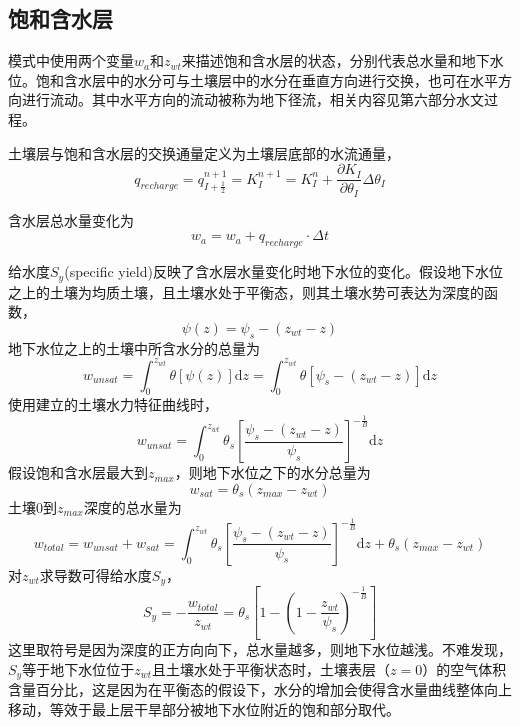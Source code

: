 \subsection{饱和含水层}
模式中使用两个变量$w_a$和$z_{wt}$来描述饱和含水层的状态，分别代表总水量和地下水位。饱和含水层中的水分可与土壤层中的水分在垂直方向进行交换，也可在水平方向进行流动。其中水平方向的流动被称为地下径流，相关内容见第六部分水文过程。

土壤层与饱和含水层的交换通量定义为土壤层底部的水流通量，
\begin{equation}
{q}_{recharge}=q_{I+\frac{1}{2}}^{n+1}=K_{I}^{n+1} = K_I^n + \frac{\partial K_{I}}{\partial \theta_{I}} \Delta \theta_{I}
\end{equation}

含水层总水量变化为
\begin{equation}
w_{a}=w_{a}+q_{recharge} \cdot \Delta t
\end{equation}

给水度$S_y$(specific yield)反映了含水层水量变化时地下水位的变化。假设地下水位之上的土壤为均质土壤，且土壤水处于平衡态，则其土壤水势可表达为深度的函数，
\begin{equation}
    \psi \left(z\right) = \psi_s - \left(z_{wt} - z\right)
\end{equation}
地下水位之上的土壤中所含水分的总量为
\begin{equation}
    w_{unsat} = \int^{z_{wt}}_0 \theta\left[\psi\left(z\right)\right] \mathrm{d}z = \int^{z_{wt}}_0 \theta\left[\psi_s - \left(z_{wt} - z\right)\right] \mathrm{d}z
\end{equation}
使用\citet{campbell1974}建立的土壤水力特征曲线时，
\begin{equation}
    w_{unsat} = \int^{z_{wt}}_0 \theta_s\left[\frac{\psi_s - \left(z_{wt} - z\right)}{\psi_s}\right]^{-\frac{1}{B}} \mathrm{d}z
\end{equation}
假设饱和含水层最大到$z_{max}$，则地下水位之下的水分总量为
\begin{equation}
w_{sat} = \theta_s\left(z_{max}-z_{wt}\right)
\end{equation}
土壤$0$到$z_{max}$深度的总水量为
\begin{equation}
    w_{total} = w_{unsat} + w_{sat} = \int^{z_{wt}}_0 \theta_s\left[\frac{\psi_s - \left(z_{wt} - z\right)}{\psi_s}\right]^{-\frac{1}{B}} \mathrm{d}z + \theta_s\left(z_{max}-z_{wt}\right)
\end{equation}
对$z_{wt}$求导数可得给水度$S_y$，
\begin{equation}
{S}_{{y}} = -\frac{w_{total}}{z_{wt}} = \theta_{s}\left[1-\left(1-\frac{z_{w t}}{\psi_{s}}\right)^{-\frac{1}{B}}\right] \label{eqn:s_y}
\end{equation}
这里取符号是因为深度的正方向向下，总水量越多，则地下水位越浅。不难发现，$S_y$等于地下水位位于$z_{wt}$且土壤水处于平衡状态时，土壤表层（$z=0$）的空气体积含量百分比，这是因为在平衡态的假设下，水分的增加会使得含水量曲线整体向上移动，等效于最上层干旱部分被地下水位附近的饱和部分取代。


